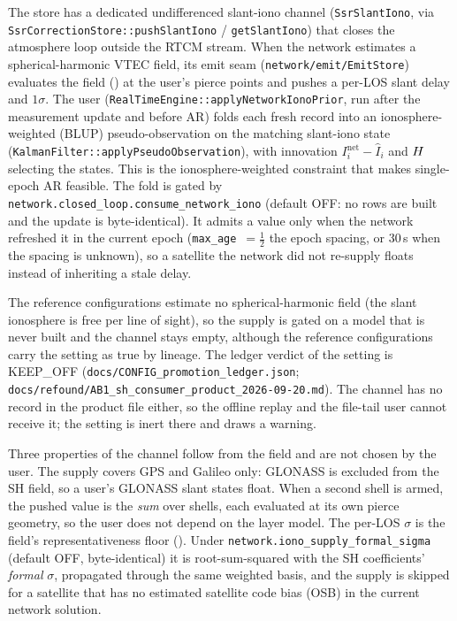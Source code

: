 \documentclass[main.tex]{subfiles}
\begin{document}
The store has a dedicated undifferenced slant-iono channel
(\texttt{SsrSlantIono}, via \texttt{SsrCorrectionStore::pushSlantIono} /
\texttt{getSlantIono}) that closes the atmosphere loop outside the RTCM
stream. When the network estimates a spherical-harmonic VTEC field, its emit
seam (\texttt{network/emit/EmitStore}) evaluates the field
() at the user's pierce
points and pushes a per-LOS slant delay and $1\sigma$. The user
(\texttt{RealTimeEngine::applyNetworkIonoPrior}, run after the measurement
update and before AR) folds each fresh record into an ionosphere-weighted
(BLUP) pseudo-observation on the matching slant-iono state
(\texttt{KalmanFilter::applyPseudoObservation}), with innovation
$I^{\mathrm{net}}_i - \hat{I}_i$ and $H$ selecting the states. This is the
ionosphere-weighted constraint that makes single-epoch AR feasible. The
fold is gated by \texttt{network.closed\_loop.consume\_network\_iono}
(default OFF: no rows are built and the update is byte-identical). It admits a
value only when the network refreshed it in the current epoch
(\texttt{max\_age}~$=\tfrac12$ the epoch spacing, or 30\,s when the spacing
is unknown), so a satellite the network did not re-supply floats instead
of inheriting a stale delay.

The reference configurations estimate no spherical-harmonic field (the slant
ionosphere is free per line of sight), so the supply is gated on a model that
is never built and the channel stays empty, although the reference
configurations carry the setting as true by lineage. The ledger verdict of the
setting is KEEP\_OFF (\texttt{docs/CONFIG\_promotion\_ledger.json};
\texttt{docs/refound/AB1\_sh\_consumer\_product\_2026-09-20.md}). The channel
has no record in the product file either, so the offline replay and the
file-tail user cannot receive it; the setting is inert there and draws a
warning.

Three properties of the channel follow from the field and are not chosen
by the user. The supply covers GPS and Galileo only: GLONASS is
excluded from the SH field, so a user's GLONASS slant states float.
When a second shell is armed, the pushed value is the \emph{sum} over
shells, each evaluated at its own pierce geometry, so the user does not
depend on the layer model. The per-LOS $\sigma$ is the field's
representativeness floor (). Under \texttt{network.iono\_supply\_formal\_sigma}
(default OFF, byte-identical) it is root-sum-squared with the SH
coefficients' \emph{formal} $\sigma$, propagated through the same weighted
basis, and the supply is skipped for a satellite that has no estimated
satellite code bias (OSB) in the current network solution.
\end{document}

